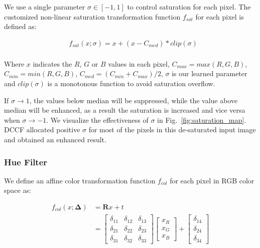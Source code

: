 \documentclass[runningheads]{llncs}
\begin{document}
    We use a single parameter $\sigma \in [-1,1]$ to control saturation for each pixel.
    The customized non-linear saturation transformation function $f_{sat}$ for each pixel is defined as:
    
    \begin{equation}
    \label{eq:sat}
    \begin{aligned}
            &f_{sat}(x;\sigma) = x + (x - C_{med}) * clip(\sigma) \\
\end{aligned}
    \end{equation}
      
    Where $x$ indicates the $R$, $G$ or $B$ values in each pixel, $C_{max}=max(R,G,B)$, $C_{min}=min(R, G, B)$, $C_{med} = (C_{min}+C_{max})/2$,
    $\sigma$ is our learned parameter and $clip(\sigma)$ is a monotonous function to avoid saturation overflow.
    


If $\sigma \rightarrow 1$, the values below median will be suppressed, while the value above median will be enhanced, as a result the saturation is increased and vice versa when $\sigma \rightarrow -1$.
    We visualize the effectiveness of $\sigma$ in Fig.~\ref{fig:saturation_map}. 
    DCCF allocated positive $\sigma$ for most of the pixels in this de-saturated input image and obtained an enhanced result.
    


\subsubsection{Hue Filter}


    We define an affine color transformation function $f_{col}$ for each pixel in RGB color space as:




    \begin{equation}
    \begin{aligned}
    f_{col}(x; \bm{\Delta})&=\bm{R}x + t \\
    &=
    \begin{bmatrix}
    \delta_{11} & \delta_{12} & \delta_{13} \\
    \delta_{21} & \delta_{22} & \delta_{23}\\
    \delta_{31} & \delta_{32} & \delta_{33}
    \end{bmatrix}
    \begin{bmatrix}
    x_R\\
    x_G\\
    x_B
    \end{bmatrix}
    +
    \begin{bmatrix}
    \delta_{14}\\
    \delta_{24}\\
    \delta_{34}
    \end{bmatrix}
    \end{aligned}
    \label{eq:hue_filter}
    \end{equation}
    
\end{document}
